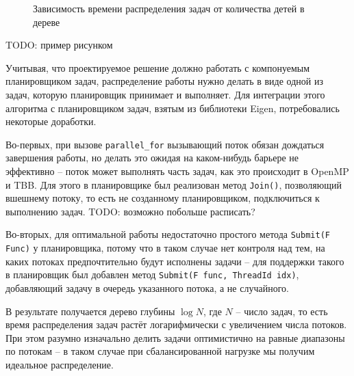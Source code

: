 \documentclass[times,specification,annotation]{itmo-student-thesis}
\begin{document}



\begin{figure}[ht!]
\centering

\caption{Зависимость времени распределения задач от количества детей в дереве}\label{Fig:SchedulingTimeTree}
\end{figure}

TODO: пример рисунком

Учитывая, что проектируемое решение должно работать с компонуемым планировщиком задач, распределение работы нужно делать в виде одной из задач, которую планировщик принимает и выполняет. Для интеграции этого алгоритма с планировщиком задач, взятым из библиотеки Eigen, потребовались некоторые доработки.

Во-первых, при вызове \texttt{parallel\_for} вызывающий поток обязан дождаться завершения работы, но делать это ожидая на каком-нибудь барьере не эффективно -- поток может выполнять часть задач, как это происходит в OpenMP и TBB. Для этого в планировщике был реализован метод \texttt{Join()}, позволяющий вшешнему потоку, то есть не созданному планировщиком, подключиться к выполнению задач.
TODO:  возможно побольше расписать?

Во-вторых, для оптимальной работы недостаточно простого метода \texttt{Submit(F Func)} у планировщика, потому что в таком случае нет контроля над тем, на каких потоках предпочтительно будут исполнены задачи -- для поддержки такого в планировщик был добавлен метод \texttt{Submit(F func, ThreadId idx)}, добавляющий задачу в очередь указанного потока, а не случайного.

В результате получается дерево глубины $\log {N}$, где $N$ -- число задач, то есть время распределения задач растёт логарифмически с увеличением числа потоков. При этом разумно изначально делить задачи оптимистично на равные диапазоны по потокам -- в таком случае при сбалансированной нагрузке мы получим идеальное распределение.
\end{document}
